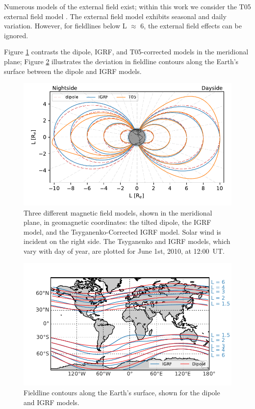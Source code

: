 Numerous models of the external field exist; within this work we consider the T05 external field model \citep{Tsyganenko2005}. The external field model exhibits seasonal and daily variation. However, for fieldlines below L $\approx$ 6, the external field effects can be ignored. 

Figure \ref{fig:fieldline_example} contrasts the dipole, IGRF, and T05-corrected models in the meridional plane; Figure \ref{fig:Lshell_example} illustrates the deviation in fieldline contours along the Earth's surface between the dipole and IGRF models.

\begin{figure}[t]
\begin{center}
\includegraphics{figures/fieldline_models.pdf}
\end{center}

\caption[Magnetic field models]{Three different magnetic field models, shown in the meridional plane, in geomagnetic coordinates: the tilted dipole, the IGRF model, and the Tsyganenko-Corrected IGRF model. Solar wind is incident on the right side. The Tsyganenko and IGRF models, which vary with day of year, are plotted for June 1st, 2010, at 12:00~UT.}
\label{fig:fieldline_example}
\end{figure}
\begin{figure}
\begin{center}
	\includegraphics{figures/Lshell_contours.pdf}
\end{center}
\caption[L-shell contours on the Earth's surface]{Fieldline contours along the Earth's surface, shown for the dipole and IGRF models.}
\label{fig:Lshell_example}
\end{figure}

